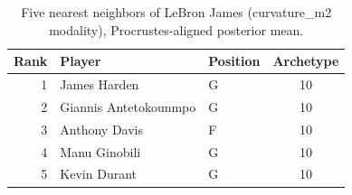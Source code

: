 \begin{table}[htbp]
  \centering\small
  \begin{tabular}{rllc}
    \toprule
    Rank & Player & Position & Archetype \\
    \midrule
    1 & James Harden & G & 10 \\
    2 & Giannis Antetokounmpo & G & 10 \\
    3 & Anthony Davis & F & 10 \\
    4 & Manu Ginobili & G & 10 \\
    5 & Kevin Durant & G & 10 \\
    \bottomrule
  \end{tabular}
  \caption{Five nearest neighbors of LeBron James (curvature_m2 modality), Procrustes-aligned posterior mean.}
  \label{tab:LeBron_James_neighbors_curvature_m2}
\end{table}

